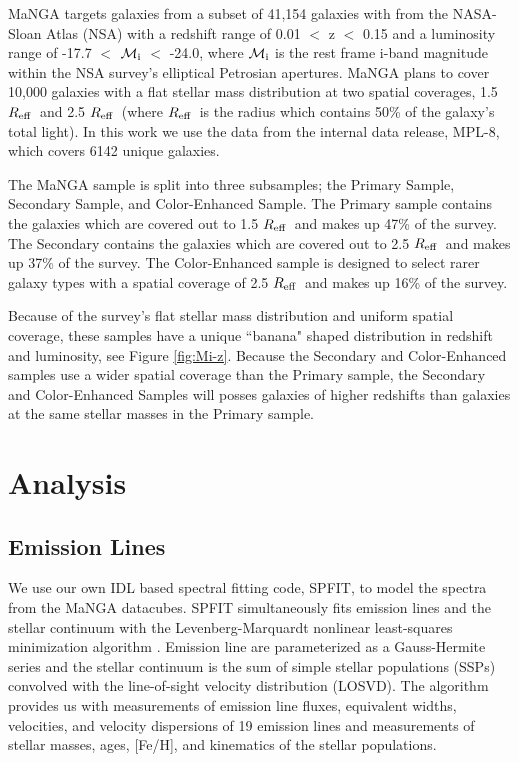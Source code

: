 \documentclass[iop,revtex4,twocolumn,apj,numberedappendix,appendixfloats]{emulateapj}
\newcommand{\reff}{$R_{\rm eff}$}
\begin{document}
MaNGA targets galaxies from a subset of 41,154 galaxies with from the NASA-Sloan Atlas (NSA) with a redshift range of 0.01 $<$ z $<$ 0.15 and a luminosity range of -17.7 $<$ $\mathcal{M_{\rm i}}$ $<$ -24.0, where $\mathcal{M_{\rm i}}$ is the rest frame i-band magnitude within the NSA survey's elliptical Petrosian apertures. MaNGA plans to cover 10,000 galaxies with a flat stellar mass distribution at two spatial coverages, 1.5 \reff\ and 2.5 \reff\ (where \reff\ is the radius which contains 50\% of the galaxy's total light). In this work we use the data from the internal data release, MPL-8, which covers 6142 unique galaxies. 

The MaNGA sample is split into three subsamples; the Primary Sample, Secondary Sample, and Color-Enhanced Sample. The Primary sample contains the galaxies which are covered out to 1.5 \reff\ and makes up 47\% of the survey. The Secondary contains the galaxies which are covered out to 2.5 \reff\ and makes up 37\% of the survey. The Color-Enhanced sample is designed to select rarer galaxy types with a spatial coverage of 2.5 \reff\ and makes up 16\% of the survey. 

Because of the survey's flat stellar mass distribution and uniform spatial coverage, these samples have a unique ``banana" shaped distribution in redshift and luminosity, see Figure \ref{fig:Mi-z}. Because the Secondary and Color-Enhanced samples use a wider spatial coverage than the Primary sample, the Secondary and Color-Enhanced Samples will posses galaxies of higher redshifts than galaxies at the same stellar masses in the Primary sample. 



\section{Analysis}\label{sec:analysis}
\subsection{Emission Lines}
We use our own {\sc IDL} based spectral fitting code, {\sc SPFIT}, to model the spectra from the MaNGA datacubes. {\sc SPFIT} simultaneously fits emission lines and the stellar continuum with the Levenberg-Marquardt nonlinear least-squares minimization algorithm \citep{Fu:2018}. Emission line are parameterized as a Gauss-Hermite series and the stellar continuum is the sum of simple stellar populations (SSPs) convolved with the line-of-sight velocity distribution (LOSVD). The algorithm provides us with measurements of emission line fluxes, equivalent widths, velocities, and velocity dispersions of 19 emission lines and measurements of stellar masses, ages, [Fe/H], and kinematics of the stellar populations. 
\end{document}
